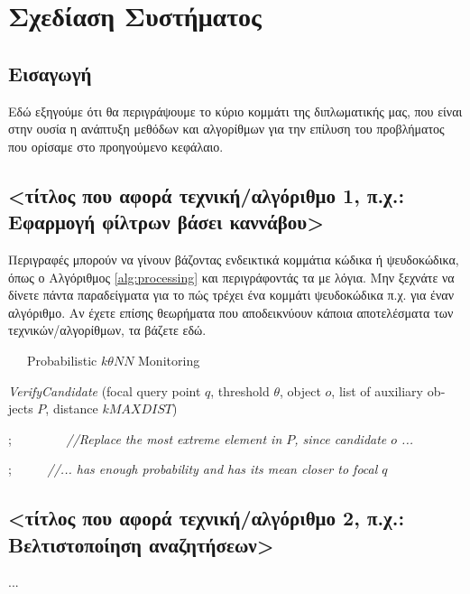 \chapter{Σχεδίαση Συστήματος}
\label{chap4}

\section{Εισαγωγή}

Εδώ εξηγούμε ότι θα περιγράψουμε το κύριο κομμάτι της διπλωματικής μας, που είναι στην ουσία η ανάπτυξη μεθόδων και αλγορίθμων για την επίλυση του προβλήματος που ορίσαμε στο προηγούμενο κεφάλαιο. 

\section{<τίτλος που αφορά τεχνική/αλγόριθμο 1, π.χ.: Εφαρμογή φίλτρων βάσει καννάβου>}

Περιγραφές μπορούν να γίνουν βάζοντας ενδεικτικά κομμάτια κώδικα ή ψευδοκώδικα, όπως ο Αλγόριθμος \ref{alg:processing} και περιγράφοντάς τα με λόγια. Μην ξεχνάτε να δίνετε πάντα παραδείγματα για το πώς τρέχει ένα κομμάτι ψευδοκώδικα π.χ. για έναν αλγόριθμο.
Αν έχετε επίσης θεωρήματα που αποδεικνύουν κάποια αποτελέσματα των τεχνικών/αλγορίθμων, τα βάζετε εδώ. 

\begin{otherlanguage}{english}
\begin{algorithm}
\caption{\ \ \ Probabilistic $k\theta NN$ Monitoring}
\begin{algorithmic}[1]
\begin{footnotesize}

 {\em VerifyCandidate} (focal query point $q$, threshold $\theta$, object $o$, list of auxiliary objects $P$, distance $kMAXDIST$) 


;   \ \ \ \ \ \ \ \ {\em //Replace the most extreme element in $P$, since candidate $o$ ... }

;  \ \ \ \ \ {\em //... has enough probability and has its mean closer to focal $q$ }

\ENDIF



\end{footnotesize}
\end{algorithmic}
\label{alg:processing}
\end{algorithm}
\end{otherlanguage}


\section{<τίτλος που αφορά τεχνική/αλγόριθμο 2, π.χ.: Βελτιστοποίηση αναζητήσεων>}

...


